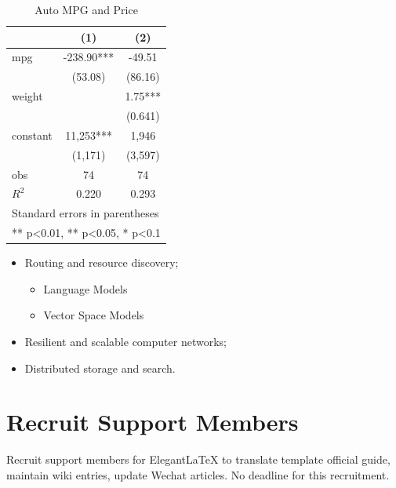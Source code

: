 \documentclass[en,hazy,device=normal,blue,14pt]{elegantnote}
\begin{document}
\begin{table}[htbp]
  \small
  \centering
  \caption{Auto MPG and Price \label{tab:reg}}
    \begin{tabular}{lcc}
    \toprule
                    &       (1)         &        (2)      \\
    \midrule
    mpg             &    -238.90***     &      -49.51     \\
                    &     (53.08)       &      (86.16)    \\
    weight          &                   &      1.75***    \\
                    &                   &      (0.641)    \\
    constant        &     11,253***     &       1,946     \\
                    &     (1,171)       &      (3,597)   \\
    obs             &        74         &         74     \\
    $R^2$           &      0.220        &       0.293    \\
    \bottomrule
    \multicolumn{3}{l}{\scriptsize Standard errors in parentheses} \\
    \multicolumn{3}{l}{\scriptsize *** p<0.01, ** p<0.05, * p<0.1} \\
    \end{tabular}%
\end{table}%


\begin{itemize}[noitemsep]
  \item Routing and resource discovery;
    \begin{itemize} 
      \item Language Models
      \item Vector Space Models
    \end{itemize}
  \item Resilient and scalable computer networks;
  \item Distributed storage and search.
\end{itemize}


\section{Recruit Support Members}

Recruit support members for Elegant\LaTeX{} to translate template official guide, maintain wiki entries, update Wechat articles. No deadline for this recruitment.
\end{document}
